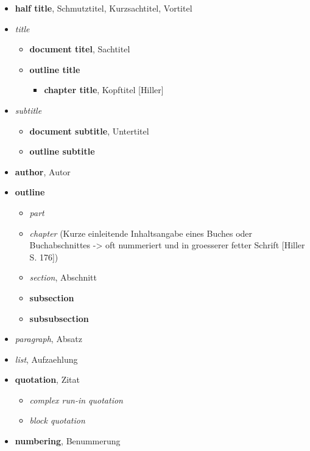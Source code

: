   \begin{itemize}
  \itemsep1pt\parskip0pt
  \item
    \textbf{half title}, Schmutztitel, Kurzsachtitel, Vortitel
  \item
    \emph{title}

    \begin{itemize}
    \itemsep1pt\parskip0pt
    \item
      \textbf{document titel}, Sachtitel
    \item
      \textbf{outline title}

      \begin{itemize}
      \itemsep1pt\parskip0pt
      \item
        \textbf{chapter title}, Kopftitel {[}Hiller{]}
      \end{itemize}
    \end{itemize}
  \item
    \emph{subtitle}

    \begin{itemize}
    \itemsep1pt\parskip0pt
    \item
      \textbf{document subtitle}, Untertitel
    \item
      \textbf{outline subtitle}
    \end{itemize}
  \item
    \textbf{author}, Autor
  \item
    \textbf{outline}

    \begin{itemize}
    \itemsep1pt\parskip0pt
    \item
      \emph{part}
    \item
      \emph{chapter} (Kurze einleitende Inhaltsangabe eines Buches oder
      Buchabschnittes -\textgreater{} oft nummeriert und in groesserer
      fetter Schrift {[}Hiller S. 176{]})
    \item
      \emph{section}, Abschnitt
    \item
      \textbf{subsection}
    \item
      \textbf{subsubsection}
    \end{itemize}
  \item
    \emph{paragraph}, Absatz
  \item
    \emph{list}, Aufzaehlung
  \item
    \textbf{quotation}, Zitat

    \begin{itemize}
    \itemsep1pt\parskip0pt
    \item
      \emph{complex run-in quotation}
    \item
      \emph{block quotation}
    \end{itemize}
  \item
    \textbf{numbering}, Benummerung


\end{itemize}
